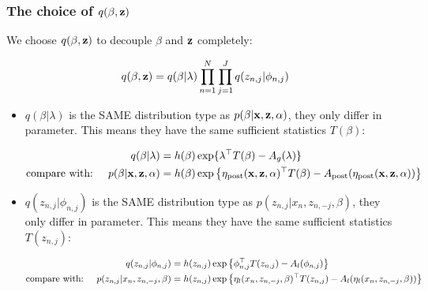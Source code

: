 \documentclass{article}
\def\post{\text{post}}
\begin{document}

\subsubsection{The choice of $q(\beta, {\mathbf z})$}


We choose $q(\beta, {\mathbf z})$ to decouple $\beta$ and ${\mathbf z}$ completely:

\begin{equation}
\begin{split}
	q (\beta, {\mathbf z}) = q(\beta | \lambda) \prod_{n=1}^N \prod_{j=1}^J q (z_{n,j} | \phi_{n,j}) 
\end{split}
\end{equation}

 

\begin{itemize}
\item
$q (\beta | \lambda)$ is the SAME distribution type as $p(\beta | {\mathbf x}, {\mathbf z}, \alpha)$, they only differ in parameter. This means they have the same sufficient statistics $T(\beta)$:

\begin{equation}
\begin{split}
	q (\beta | \lambda) &= h (\beta) \exp \{ \lambda^\top T(\beta) - A_g (\lambda)\}\\
\text{compare with:} \hspace{5 mm} 
p(\beta | \x, \z, \alpha) &= h(\beta) \exp \left\{ \eta_\post( \x, \z, \alpha)^\top T(\beta) - A_\post( \eta_\post ( \x, \z, \alpha) ) \right\}\\
\end{split}
\end{equation}

\item
$q (z_{n,j} | \phi_{n,j} )$ is the SAME distribution type as $p(z_{n,j} | x_n, z_{n,-j}, \beta )$, they only differ in parameter. This means they have the same sufficient statistics $T(z_{n,j})$:

\begin{equation}
\begin{split}
	q (z_{n,j} | \phi_{n,j} ) &= h(z_{n,j}) \exp\left\{ \phi^\top_{n,j} T(z_{n,j}) - A_l (\phi_{n,j}) \right\}\\
\text{compare with:} \hspace{5 mm} 
p(z_{n,j} | x_{n}, z_{n,-j},\beta ) &= h(z_{n,j}) \exp\left\{ \eta_l(x_n, z_{n,-j},\beta)^\top T(z_{n,j}) - A_l(\eta_l(x_n, z_{n,-j},\beta)) \right\}\\
\end{split}
\end{equation}

\end{itemize}
\end{document}
